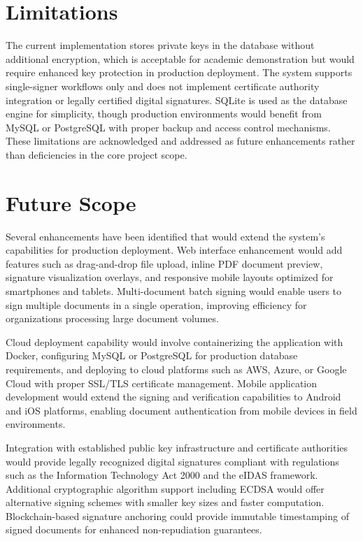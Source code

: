 \section{Limitations}

The current implementation stores private keys in the database without additional encryption, which is acceptable for academic demonstration but would require enhanced key protection in production deployment. The system supports single-signer workflows only and does not implement certificate authority integration or legally certified digital signatures. SQLite is used as the database engine for simplicity, though production environments would benefit from MySQL or PostgreSQL with proper backup and access control mechanisms. These limitations are acknowledged and addressed as future enhancements rather than deficiencies in the core project scope.

\section{Future Scope}

Several enhancements have been identified that would extend the system's capabilities for production deployment. Web interface enhancement would add features such as drag-and-drop file upload, inline PDF document preview, signature visualization overlays, and responsive mobile layouts optimized for smartphones and tablets. Multi-document batch signing would enable users to sign multiple documents in a single operation, improving efficiency for organizations processing large document volumes.

Cloud deployment capability would involve containerizing the application with Docker, configuring MySQL or PostgreSQL for production database requirements, and deploying to cloud platforms such as AWS, Azure, or Google Cloud with proper SSL/TLS certificate management. Mobile application development would extend the signing and verification capabilities to Android and iOS platforms, enabling document authentication from mobile devices in field environments.

Integration with established public key infrastructure and certificate authorities would provide legally recognized digital signatures compliant with regulations such as the Information Technology Act 2000 and the eIDAS framework. Additional cryptographic algorithm support including ECDSA would offer alternative signing schemes with smaller key sizes and faster computation. Blockchain-based signature anchoring could provide immutable timestamping of signed documents for enhanced non-repudiation guarantees.


